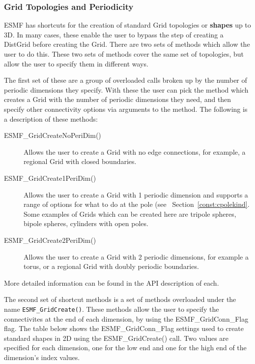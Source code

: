 \subsubsection{Grid Topologies and Periodicity}
\label{sec:ShapeShortcut}
\begin{sloppypar}
ESMF has shortcuts for the creation of standard Grid topologies 
or {\bf shapes} up to 3D.  In many cases, these enable the user to
bypass the step of creating a DistGrid before creating the Grid. 
There are two sets of methods which allow the user to do this. These two sets of methods cover the same set of topologies, but
allow the user to specify them in different ways.

 The first set of these are a group of overloaded
calls broken up by the number of periodic dimensions they specify. With these the user can pick 
the method which creates a Grid with the number of periodic dimensions they need, and then specify other connectivity 
options via arguments to the method. The following is a description of these methods:  
\end{sloppypar}

\medskip

\begin{description}
\item [ESMF\_GridCreateNoPeriDim()] Allows the user to create a Grid with no edge connections, for example, a regional Grid with closed boundaries.

\item [ESMF\_GridCreate1PeriDim()] Allows the user to create a Grid with 1 periodic dimension and supports a range of options for what to do at the pole (see ~Section~\ref{const:cpolekind}. Some examples of Grids which can be created here are tripole spheres, bipole spheres, cylinders with open poles. 

\item [ESMF\_GridCreate2PeriDim()] Allows the user to create a Grid with 2 periodic dimensions, for example a torus, or a regional Grid with
doubly periodic boundaries. 
\end{description}

More detailed information can be found in the API description of each.

\medskip

\begin{sloppypar}
The second set of shortcut methods is a set of methods overloaded under the name {\tt ESMF\_GridCreate()}. These methods
allow the user to specify the connectivites at the end of each dimension, by using the ESMF\_GridConn\_Flag flag. The table below shows the ESMF\_GridConn\_Flag settings used to create 
standard shapes in 2D using the ESMF\_GridCreate() call.  Two values
are specified for each dimension, one for the low end and one for 
the high end of the dimension's index values. 
\end{sloppypar}

